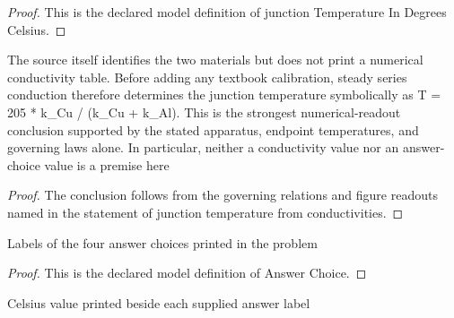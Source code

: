 \begin{proof}
  This is the declared model definition of junction Temperature In Degrees Celsius.
\end{proof}
\begin{theorem}
  \label{thm:physics:phyx-mini-0488:phyxminiproblems-problemphyxmini0488-junction-temperature-from-conductivities}
  The source itself identifies the two materials but does not print a numerical conductivity table. Before adding any textbook calibration, steady series conduction therefore determines the junction temperature symbolically as T = 205 * k\_Cu / (k\_Cu + k\_Al). This is the strongest numerical-readout conclusion supported by the stated apparatus, endpoint temperatures, and governing laws alone. In particular, neither a conductivity value nor an answer-choice value is a premise here
\end{theorem}
\begin{proof}
  The conclusion follows from the governing relations and figure readouts named in the statement of junction temperature from conductivities.
\end{proof}
\begin{definition}
  \label{def:physics:phyx-mini-0488:phyxminiproblems-problemphyxmini0488-answerchoice}
  Labels of the four answer choices printed in the problem
\end{definition}
\begin{proof}
  This is the declared model definition of Answer Choice.
\end{proof}
\begin{definition}
  \label{def:physics:phyx-mini-0488:phyxminiproblems-problemphyxmini0488-displayedjunctiontemperaturecelsius}
  Celsius value printed beside each supplied answer label
\end{definition}
